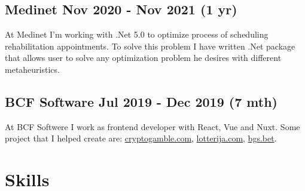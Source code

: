 \documentclass[10pt]{article}
\begin{document}
\subsection{Medinet Nov 2020 - Nov 2021 (1 yr)}
At Medinet I'm working with .Net 5.0 to optimize process of scheduling rehabilitation appointments. To solve this problem I have written .Net package that allows user to solve any optimization problem he desires with different metaheuristics.
\subsection{BCF Software Jul 2019 - Dec 2019 (7 mth) }
At BCF Softwere I work as frontend developer with React, Vue and Nuxt. Some project that I helped create are:
    \href{https://cryptogamble.com}{cryptogamble.com}, \href{https://lotterija.com}{lotterija.com}, \href{https://bgs.bet}{bgs.bet}.

\newpage
\section{Skills}
\end{document}
